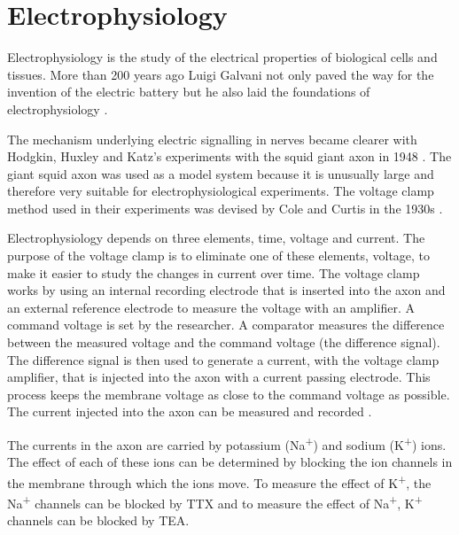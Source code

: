 \section{Electrophysiology}

Electrophysiology is the study of the electrical properties of biological cells and tissues. More than 200 years ago Luigi Galvani not only paved the way for the invention of the electric battery but he also laid the foundations of electrophysiology \cite{Piccolino1997}. 

The mechanism underlying electric signalling in nerves became clearer with Hodgkin, Huxley and Katz's experiments with the squid giant axon in 1948 \cite{Huxley2002, Hodgkin1952}. The giant squid axon was used as a model system because it is unusually large and therefore very suitable for electrophysiological experiments. The voltage clamp method used in their experiments was devised by Cole and Curtis in the 1930s \cite{Cole1939}. 

Electrophysiology depends on three elements, time, voltage and current. The purpose of the voltage clamp is to eliminate one of these elements, voltage, to make it easier to study the changes in current over time. The voltage clamp works by using an internal recording electrode that is inserted into the axon and an external reference electrode to measure the voltage with an amplifier. A command voltage is set by the researcher. A comparator measures the difference between the measured voltage and the command voltage (the difference signal). The difference signal is then used to generate a current, with the voltage clamp amplifier, that is injected into the axon with a current passing electrode. This process keeps the membrane voltage as close to the command voltage as possible. The current injected into the axon can be measured and recorded \cite{Purves2012}. 

The currents in the axon are carried by potassium (Na\textsuperscript{+}) and sodium (K\textsuperscript{+}) ions. The effect of each of these ions can be determined by blocking the ion channels in the membrane through which the ions move. To measure the effect of K\textsuperscript{+}, the Na\textsuperscript{+} channels can be blocked by \ac{TTX} and to measure the effect of Na\textsuperscript{+}, K\textsuperscript{+} channels can be blocked by \ac{TEA}.



